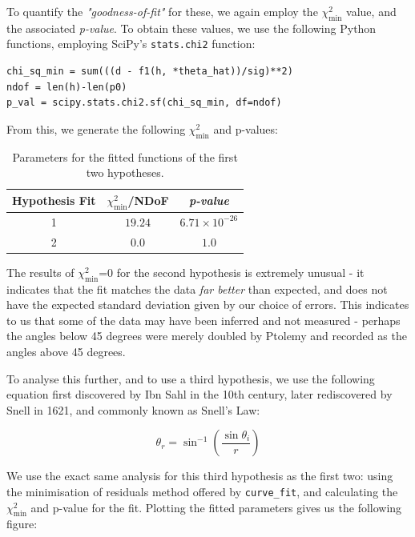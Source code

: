 \documentclass[a4paper]{article}
\begin{document}
To quantify the {\it "goodness-of-fit"} for these, we again employ the $\chi^2_\text{min}$ value, and the associated {\it p-value}. To obtain these values, we use the following Python functions, employing SciPy's \lstinline$stats.chi2$ function:

\begin{lstlisting}
chi_sq_min = sum(((d - f1(h, *theta_hat))/sig)**2)
ndof = len(h)-len(p0)
p_val = scipy.stats.chi2.sf(chi_sq_min, df=ndof)
\end{lstlisting}

From this, we generate the following $\chi^2_\text{min}$  and p-values:

\begin{table}[h!]
\centering
\begin{tabular}{ccc}
\hline
Hypothesis Fit & $\chi^2_\text{min}$/NDoF & {\it p-value}\\ \hline
1 & $19.24$ & $6.71\times10^{-26}$ \\
2 & $0.0$ & $1.0$ \\
\end{tabular}
\caption{\label{tab:chi1}Parameters for the fitted functions of the first two hypotheses.}
\end{table}

The results of $\chi^2_\text{min}$=0 for the second hypothesis is extremely unusual - it indicates that the fit matches the data {\it far better} than expected, and does not have the expected standard deviation given by our choice of errors. This indicates to us that some of the data may have been inferred and not measured - perhaps the angles below 45 degrees were merely doubled by Ptolemy and recorded as the angles above 45 degrees.

To analyse this further, and to use a third hypothesis, we use the following equation first discovered by Ibn Sahl in the 10th century, later rediscovered by Snell in 1621, and commonly known as Snell's Law:

\begin{equation}
\theta_r=\sin^{-1}\left(\frac{\sin\theta_i}r\right)
\end{equation}

We use the exact same analysis for this third hypothesis as the first two: using the minimisation of residuals method offered by \lstinline$curve_fit$, and calculating the $\chi^2_\text{min}$ and p-value for the fit. Plotting the fitted parameters gives us the following figure:
\end{document}
